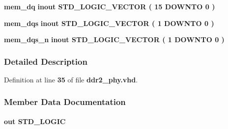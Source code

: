 \begin{DoxyCompactItemize}
\item 
{\bf mem\+\_\+dq}  {\bfseries {\bfseries \textcolor{keywordflow}{inout}\textcolor{vhdlchar}{ }}} {\bfseries \textcolor{comment}{S\+T\+D\+\_\+\+L\+O\+G\+I\+C\+\_\+\+V\+E\+C\+T\+OR}\textcolor{vhdlchar}{ }\textcolor{vhdlchar}{(}\textcolor{vhdlchar}{ }\textcolor{vhdlchar}{ } \textcolor{vhdldigit}{15} \textcolor{vhdlchar}{ }\textcolor{keywordflow}{D\+O\+W\+N\+TO}\textcolor{vhdlchar}{ }\textcolor{vhdlchar}{ } \textcolor{vhdldigit}{0} \textcolor{vhdlchar}{ }\textcolor{vhdlchar}{)}\textcolor{vhdlchar}{ }} 
\item 
{\bf mem\+\_\+dqs}  {\bfseries {\bfseries \textcolor{keywordflow}{inout}\textcolor{vhdlchar}{ }}} {\bfseries \textcolor{comment}{S\+T\+D\+\_\+\+L\+O\+G\+I\+C\+\_\+\+V\+E\+C\+T\+OR}\textcolor{vhdlchar}{ }\textcolor{vhdlchar}{(}\textcolor{vhdlchar}{ }\textcolor{vhdlchar}{ } \textcolor{vhdldigit}{1} \textcolor{vhdlchar}{ }\textcolor{keywordflow}{D\+O\+W\+N\+TO}\textcolor{vhdlchar}{ }\textcolor{vhdlchar}{ } \textcolor{vhdldigit}{0} \textcolor{vhdlchar}{ }\textcolor{vhdlchar}{)}\textcolor{vhdlchar}{ }} 
\item 
{\bf mem\+\_\+dqs\+\_\+n}  {\bfseries {\bfseries \textcolor{keywordflow}{inout}\textcolor{vhdlchar}{ }}} {\bfseries \textcolor{comment}{S\+T\+D\+\_\+\+L\+O\+G\+I\+C\+\_\+\+V\+E\+C\+T\+OR}\textcolor{vhdlchar}{ }\textcolor{vhdlchar}{(}\textcolor{vhdlchar}{ }\textcolor{vhdlchar}{ } \textcolor{vhdldigit}{1} \textcolor{vhdlchar}{ }\textcolor{keywordflow}{D\+O\+W\+N\+TO}\textcolor{vhdlchar}{ }\textcolor{vhdlchar}{ } \textcolor{vhdldigit}{0} \textcolor{vhdlchar}{ }\textcolor{vhdlchar}{)}\textcolor{vhdlchar}{ }} 
\end{DoxyCompactItemize}


\subsubsection{Detailed Description}


Definition at line {\bf 35} of file {\bf ddr2\+\_\+phy.\+vhd}.



\subsubsection{Member Data Documentation}
\paragraph[{aux\+\_\+full\+\_\+rate\+\_\+clk}]{ {\bfseries \textcolor{keywordflow}{out}\textcolor{vhdlchar}{ }} {\bfseries \textcolor{comment}{S\+T\+D\+\_\+\+L\+O\+G\+IC}\textcolor{vhdlchar}{ }} \hspace{0.3cm}{\ttfamily [Port]}}\label{classddr2__phy_a36d0d46bf0f1e63ff4a37da4258f45ae}


